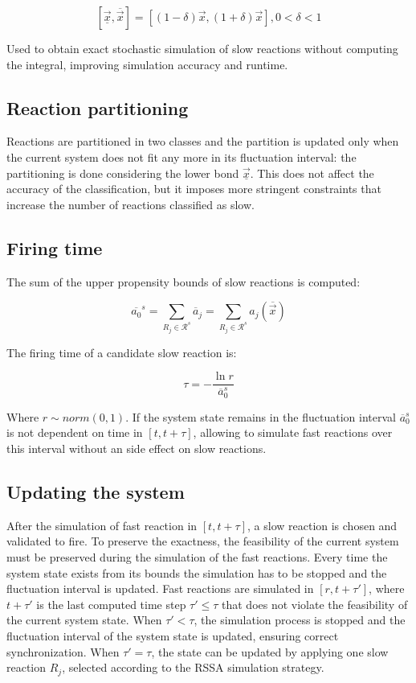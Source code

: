$$[\underline{\vec{x}}, \overline{\vec{x}}] = [(1-\delta)\vec{x}, (1+\delta)\vec{x}], 0<\delta<1$$

Used to obtain exact stochastic simulation of slow reactions without computing the integral, improving simulation accuracy and runtime.

  \subsection{Reaction partitioning}
  Reactions are partitioned in two classes and the partition is updated only when the current system does not fit any more in its fluctuation interval: the partitioning is done considering the lower bond $\underline{\vec{x}}$.
  This does not affect the accuracy of the classification, but it imposes more stringent constraints that increase the number of reactions classified as slow.

  \subsection{Firing time}
  The sum of the upper propensity bounds of slow reactions is computed:

  $$\overline{a_0}^s = \sum\limits_{R_j\in\mathcal{R}^s}\overline{a}_j = \sum\limits_{R_j\in\mathcal{R}^s}a_j(\overline{\vec{x}})$$

  The firing time of a candidate slow reaction is:

  $$\tau = -\frac{\ln r}{\overline{a}_0^s}$$

  Where $r\sim norm(0,1)$.
  If the system state remains in the fluctuation interval $\overline{a}_0^s$ is not dependent on time in $[t, t+\tau]$, allowing to simulate fast reactions over this interval without an side effect on slow reactions.

  \subsection{Updating the system}
  After the simulation of fast reaction in $[t,t+\tau]$, a slow reaction is chosen and validated to fire.
  To preserve the exactness, the feasibility of the current system must be preserved during the simulation of the fast reactions.
  Every time the system state exists from its bounds the simulation has to be stopped and the fluctuation interval is updated.
  Fast reactions are simulated in $[r,t+\tau']$, where $t+\tau'$ is the last computed time step $\tau'\le \tau$ that does not violate the feasibility of the current system state.
  When $\tau'< \tau$, the simulation process is stopped and the fluctuation interval of the system state is updated, ensuring correct synchronization.
  When $\tau'=\tau$, the state can be updated by applying one slow reaction $R_j$, selected according to the RSSA simulation strategy.

